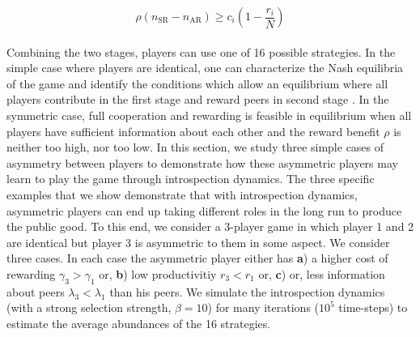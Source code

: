 \documentclass[11pt]{article}
\theoremstyle{plainCl1}
\theoremstyle{plainCl2}
\begin{document}
\begin{equation}
\rho(n_{\mathrm{SR}} - n_{\mathrm{AR}}) \geq c_i \left( 1 - \frac{r_i}{N} \right)
\label{Eq:palrewardsequation}
\end{equation}
\\
\noindent Combining the two stages, players can use one of 16 possible strategies. In the simple case where players are identical, one can characterize the Nash equilibria of the game and identify the conditions which allow an equilibrium where all players contribute in the first stage and reward peers in second stage \cite{Pal:NatCom:2022}. In the symmetric case, full cooperation and rewarding is feasible in equilibrium when all players have sufficient information about each other and the reward benefit $\rho$ is neither too high, nor too low. In this section, we study three simple cases of asymmetry between players to demonstrate how these asymmetric players may learn to play the game through introspection dynamics. The three specific examples that we show demonstrate that with introspection dynamics, asymmetric players can end up taking different roles in the long run to produce the public good. To this end, we consider a 3-player game in which player 1 and 2 are identical but player 3 is asymmetric to them in some aspect. We consider three cases. In each case the asymmetric player either has \textbf{a}) a higher cost of rewarding $\gamma_3 > \gamma_1$  or, \textbf{b}) low productivitiy  $r_3 < r_1$ or, \textbf{c}) or, less information about peers $\lambda_3 < \lambda_1$ than his peers. We simulate the introspection dynamics (with a strong selection strength, $\beta = 10$) for many iterations ($10^5$ time-steps) to estimate the average abundances of the 16 strategies. 
\\ \\
\end{document}
